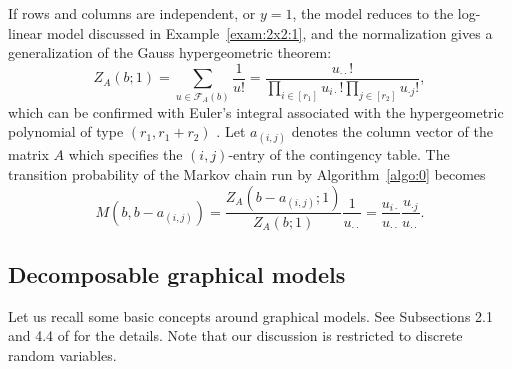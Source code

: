 \documentclass[a4paper,12pt]{article}
\theoremstyle{plain}
\theoremstyle{remark}
\begin{document}
If rows and columns are independent, or $y=1$, the model
reduces to the log-linear model discussed in Example~\ref{exam:2x2:1},
and the normalization gives a generalization of the Gauss
hypergeometric theorem:
\begin{equation}\label{GHT}
  Z_A(b;1)=\sum_{u\in\mathcal{F}_A(b)}\frac{1}{u!}
  =\frac{u_{\cdot\cdot}!}{\prod_{i\in[r_1]}u_{i\cdot}!
   \prod_{j\in[r_2]}u_{\cdot j}!},
\end{equation}
which can be confirmed with Euler's integral associated with 
the hypergeometric polynomial of type $(r_1,r_1+r_2)$
\cite[Theorem 3.3]{AK11}. Let $a_{(i,j)}$ denotes the column
vector of the matrix $A$ which specifies the $(i,j)$-entry of
the contingency table. The transition probability of the Markov
chain run by Algorithm~\ref{algo:0} becomes
\begin{equation}
  M(b,b-a_{(i,j)})=\frac{Z_A(b-a_{(i,j)};1)}{Z_A(b;1)}
  \frac{1}{u_{\cdot\cdot}}=\frac{u_{i\cdot}}{u_{\cdot\cdot}}
  \frac{u_{\cdot j}}{u_{\cdot\cdot}}.
  \label{urn}
\end{equation}

\subsection{Decomposable graphical models}
\label{subs:dec}

Let us recall some basic concepts around graphical models.
See Subsections 2.1 and 4.4 of \cite{Lau94} for the details.
Note that our discussion is restricted to discrete random
variables.
\end{document}
